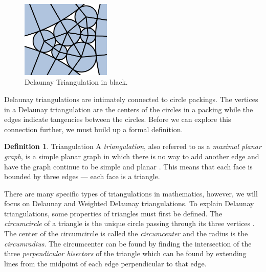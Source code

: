 \documentclass[11pt]{article}
\theoremstyle{definition}
\newtheorem{definition}{Definition}[section]
\begin{document}
	\begin{figure}
  		\begin{center}
    		\includegraphics[width=0.38\textwidth]{delaunayemph}
  		\end{center}
  		\caption{Delaunay Triangulation in black.}
	\end{figure}

	Delaunay triangulations are intimately connected to circle packings. 
	The vertices in a Delaunay triangulation are the centers of the circles in a packing while the edges indicate tangencies between the circles. 
	Before we can explore this connection further, we must build up a formal definition.
	
	\theoremstyle{definition}
	\begin{definition}{Triangulation}
		A \emph{triangulation}, also referred to as a \emph{maximal planar graph}, is a simple planar graph in which there is no way to add another edge and have the graph continue to be simple and planar \cite{meshGeneration}. 
		This means that each face is bounded by three edges --- each face is a triangle.
	\end{definition}


	There are many specific types of triangulations in mathematics, however, we will focus on Delaunay and Weighted Delaunay triangulations. 
	To explain Delaunay triangulations, some properties of triangles must first be defined. 
	The \emph{circumcircle} of a triangle is the unique circle passing through its three vertices \cite{mathworld:Circumcenter}. 
	The center of the circumcircle is called the \emph{circumcenter} and the radius is the \emph{circumradius}. 
	The circumcenter can be found by finding the intersection of the three \emph{perpendicular bisectors} of the triangle which can be found by extending lines from the midpoint of each edge perpendicular to that edge.
\end{document}
